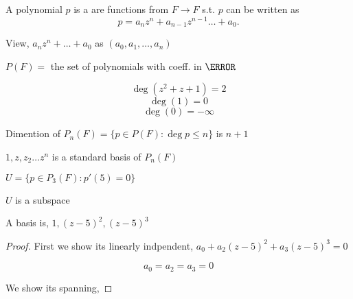 \begin{definition}[Polynomial]
    A polynomial $p$ is a are functions from $F \rightarrow F$ s.t. $p$ can be written as \[
        p = a_nz^n + a_{n-1}z^{n-1} \dots + a_0
    .\] 
\end{definition}

\begin{remark}
    View, $a_nz^n + \dots + a_0$ as $(a_0,a_1,\dots,a_n)$
\end{remark}


\begin{remark}
    $P(F) = $ the set of polynomials with coeff. in  $\F$
\end{remark}

\begin{eg}
    $$\deg(z^2 + z + 1) = 2$$
    $$\deg(1) = 0$$
    $$\deg(0) = -\infty$$
\end{eg}


Dimention of $P_n(F) = \{p \in P(F) : \deg p \leq n\}$ is $n + 1$


 $1, z, z_2 \dots z^n$ is a standard basis of $P_n(F)$

\begin{eg}
    $U = \{p \in P_3(F): p'(5) = 0\}$

    $U$ is a subspace

     A basis is, $1, (z-5)^2, (z-5)^3$

     \begin{proof}
         
         First we show its linearly indpendent,
         $a_0 + a_2(z-5)^2 + a_3(z-5)^3 = 0$

         $$ a_0=a_2=a_3=0$$

         We show its spanning, 

     \end{proof}
\end{eg}



